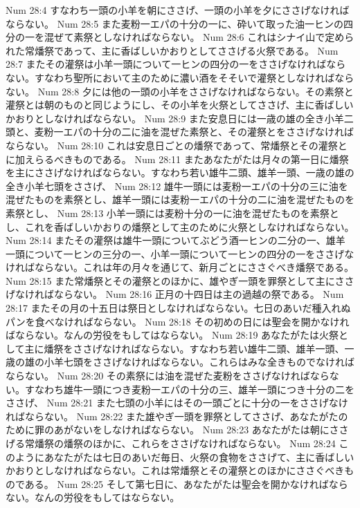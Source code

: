 Num 28:4  すなわち一頭の小羊を朝にささげ、一頭の小羊を夕にささげなければならない。
Num 28:5  また麦粉一エパの十分の一に、砕いて取った油一ヒンの四分の一を混ぜて素祭としなければならない。
Num 28:6  これはシナイ山で定められた常燔祭であって、主に香ばしいかおりとしてささげる火祭である。
Num 28:7  またその灌祭は小羊一頭について一ヒンの四分の一をささげなければならない。すなわち聖所において主のために濃い酒をそそいで灌祭としなければならない。
Num 28:8  夕には他の一頭の小羊をささげなければならない。その素祭と灌祭とは朝のものと同じようにし、その小羊を火祭としてささげ、主に香ばしいかおりとしなければならない。
Num 28:9  また安息日には一歳の雄の全き小羊二頭と、麦粉一エパの十分の二に油を混ぜた素祭と、その灌祭とをささげなければならない。
Num 28:10  これは安息日ごとの燔祭であって、常燔祭とその灌祭とに加えらるべきものである。
Num 28:11  またあなたがたは月々の第一日に燔祭を主にささげなければならない。すなわち若い雄牛二頭、雄羊一頭、一歳の雄の全き小羊七頭をささげ、
Num 28:12  雄牛一頭には麦粉一エパの十分の三に油を混ぜたものを素祭とし、雄羊一頭には麦粉一エパの十分の二に油を混ぜたものを素祭とし、
Num 28:13  小羊一頭には麦粉十分の一に油を混ぜたものを素祭とし、これを香ばしいかおりの燔祭として主のために火祭としなければならない。
Num 28:14  またその灌祭は雄牛一頭についてぶどう酒一ヒンの二分の一、雄羊一頭について一ヒンの三分の一、小羊一頭について一ヒンの四分の一をささげなければならない。これは年の月々を通じて、新月ごとにささぐべき燔祭である。
Num 28:15  また常燔祭とその灌祭とのほかに、雄やぎ一頭を罪祭として主にささげなければならない。
Num 28:16  正月の十四日は主の過越の祭である。
Num 28:17  またその月の十五日は祭日としなければならない。七日のあいだ種入れぬパンを食べなければならない。
Num 28:18  その初めの日には聖会を開かなければならない。なんの労役をもしてはならない。
Num 28:19  あなたがたは火祭として主に燔祭をささげなければならない。すなわち若い雄牛二頭、雄羊一頭、一歳の雄の小羊七頭をささげなければならない。これらはみな全きものでなければならない。
Num 28:20  その素祭には油を混ぜた麦粉をささげなければならない。すなわち雄牛一頭につき麦粉一エパの十分の三、雄羊一頭につき十分の二をささげ、
Num 28:21  また七頭の小羊にはその一頭ごとに十分の一をささげなければならない。
Num 28:22  また雄やぎ一頭を罪祭としてささげ、あなたがたのために罪のあがないをしなければならない。
Num 28:23  あなたがたは朝にささげる常燔祭の燔祭のほかに、これらをささげなければならない。
Num 28:24  このようにあなたがたは七日のあいだ毎日、火祭の食物をささげて、主に香ばしいかおりとしなければならない。これは常燔祭とその灌祭とのほかにささぐべきものである。
Num 28:25  そして第七日に、あなたがたは聖会を開かなければならない。なんの労役をもしてはならない。
